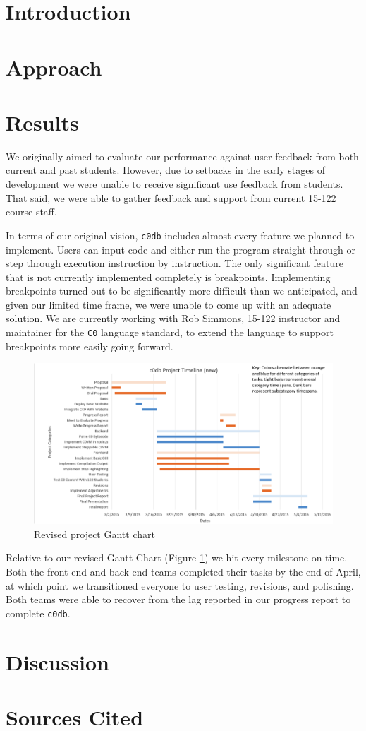\documentclass[11pt]{article}
\begin{document}
\section{Introduction}

\section{Approach}

\section{Results}
\par
We originally aimed to evaluate our performance against user feedback from both
current and past students. However, due to setbacks in the early stages of
development we were unable to receive significant use feedback from students.
That said, we were able to gather feedback and support from current 15-122
course staff.

In terms of our original vision, {\tt c0db} includes almost every feature we
planned to implement. Users can input code and either run the program straight
through or step through execution instruction by instruction. The only
significant feature that is not currently implemented completely is
breakpoints.  Implementing breakpoints turned out to be significantly more
difficult than we anticipated, and given our limited time frame, we were unable
to come up with an adequate solution. We are currently working with Rob
Simmons, 15-122 instructor and maintainer for the {\tt C0} language standard,
to extend the language to support breakpoints more easily going forward.

\begin{figure}[h]
  \includegraphics[width=\linewidth]{new-gantt}
  \caption{Revised project Gantt chart}
  \label{gantt}
\end{figure}
Relative to our revised Gantt Chart (Figure \ref{gantt}) we hit every milestone
on time. Both the front-end and back-end teams completed their tasks by the end
of April, at which point we transitioned everyone to user testing, revisions,
and polishing. Both teams were able to recover from the lag reported in our
progress report to complete {\tt c0db}.

\section{Discussion}

\section{Sources Cited}
\end{document}
